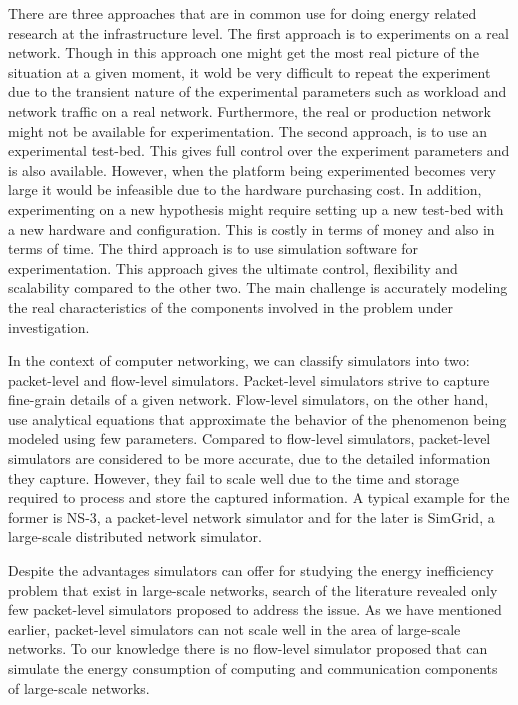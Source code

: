 There are three approaches that are in common use for doing energy related research at the infrastructure level. The first approach is to experiments on a real network. Though in this approach one might get the most real picture of the situation at a given moment, it wold be very difficult to repeat the experiment due to the transient nature of the experimental parameters such as workload and network traffic on a real network.  Furthermore, the real or production network might not be available for experimentation. The second approach, is to use an experimental test-bed. This gives full control over the experiment parameters and is also available. However, when the platform being experimented becomes very large it would be infeasible due to the hardware purchasing cost. In addition, experimenting on a new hypothesis might require setting up a new test-bed with a new hardware and configuration. This is costly in terms of money and also in terms of time. The third approach is to use simulation software for experimentation. This approach gives the ultimate control, flexibility and scalability compared to the other two. The main challenge is accurately modeling the real characteristics of the components involved in the problem under investigation.

In the context of computer networking, we can classify simulators into two: packet-level and flow-level simulators. Packet-level simulators strive to capture fine-grain details of a given network. Flow-level simulators, on the other hand, use analytical equations that approximate the behavior of the phenomenon being modeled using few parameters. Compared to flow-level simulators, packet-level simulators are considered to be more accurate, due to the detailed information they capture. However, they fail to scale well due to the time and storage required to process and store the captured information. A typical example for the former  is NS-3, a packet-level network simulator and for the later is SimGrid, a large-scale distributed network simulator. 

Despite the advantages simulators can offer for studying the energy inefficiency problem that exist in large-scale networks, search of the literature revealed only few packet-level simulators proposed to address the issue. As we have mentioned earlier, packet-level simulators can not scale well in the area of large-scale networks. To our knowledge there is no flow-level simulator proposed that can simulate the energy consumption of computing and communication components of large-scale networks. 

